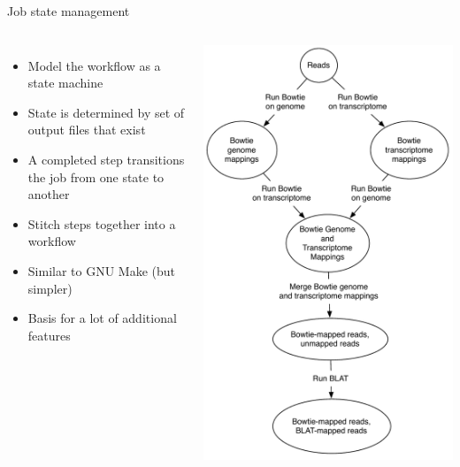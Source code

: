\documentclass{beamer}
\begin{document}
\begin{frame}{Job state management}
  \begin{columns}
    \column{2.75in}
  \begin{itemize}
  \item Model the workflow as a state machine
  \item State is determined by set of output files that exist
  \item A completed step transitions the job from one state to another
  \item Stitch steps together into a workflow
  \item Similar to GNU Make (but simpler)
  \item Basis for a lot of additional features
  \end{itemize}
    \column{2.25in}
    \includegraphics[scale=0.3]{state-machine.pdf}
  \end{columns}
\end{frame}
\end{document}

